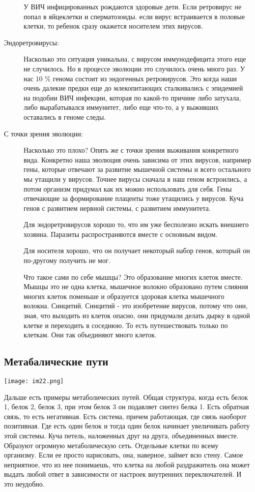 \begin{description}
У ВИЧ инфицированных рождаются здоровые дети. Если ретровирус не попал в яйцеклетки и сперматозоиды.
если вирус встраивается в половые клетки, то ребенок сразу окажется носителем этих
вирусов.

\item[Эндоретровирусы:]
Насколько это ситуация уникальна, с вирусом иммунодефицита этого еще не случилось. Но
в процессе эволюции это случилось очень много раз. У нас 10 \%  генома 
состоит из эндогенных ретровирусов. Это когда наши очень далекие предки еще до млекопитающих 
сталкивались с эпидемией на подобии ВИЧ инфекции, которая по какой-то причине либо затухала, 
либо вырабатывался иммунитет, либо еще что-то, а у выживших 
оставались в геноме следы. 

\item[С точки зрения эволюции:]
Насколько это плохо?
Опять же с точки зрения выживания конкретного вида. Конкретно 
наша эволюция очень зависима от этих вирусов, например гены, которые 
отвечают за развитие мышечной системы и всего остального мы утащили у вирусов. 
Точнее вирусы сначала в наш геном встроились, а потом организм придумал как их можно 
использовать для себя. Гены отвечающие за формирование плаценты тоже 
утащились у вирусов. Куча генов с развитием нервной системы, 
с развитием иммунитета. 

Для эндоретровирусов хорошо то, что им уже бесполезно искать внешнего хозяина. 
Паразиты распространяются вместе с основным видом. 

Для носителя хорошо, что он получает некоторый набор генов,
который он по-другому получить не мог. 

Что такое сами по себе мышцы? Это образование многих 
клеток вместе. Мышцы это не одна клетка, мышечное 
волокно образовано путем слияния многих клеток поменьше 
и образуется здоровая клетка мышечного волокна. Синцитий. 
Синцитий - это изобретение вирусов, потому что они, зная, 
что выходить из клеток опасно, они придумали делать 
дырку в одной клетке и переходить в соседнюю. То есть путешествовать только 
по клеткам. Они так объединяют много клеток.
\end{description}

\subsection{Метабалические пути}
\texttt{[image: im22.png]}

Дальше есть примеры метаболических путей. Общая структура, когда 
есть белок 1, белок 2, белок 3, при этом белок 3 он подавляет синтез белка 1. 
Есть обратная связь, то есть негативная. Есть система, причем работающая, 
где связь наоборот позитивная. Где есть один белок и 
тогда один белок начинает увеличивать работу этой системы. Куча петель, наложенных 
друг на друга, объединенных вместе. Образуют огромную метаболическую сеть. Отдельные клетки 
по всему организму. Если ее просто нарисовать, она, наверное, займет всю стену. Самое 
неприятное, что из нее понимаешь, что клетка на любой раздражитель она может выдать 
любой ответ в зависимости от настроек внутренних переключателей. И это неудобно.

